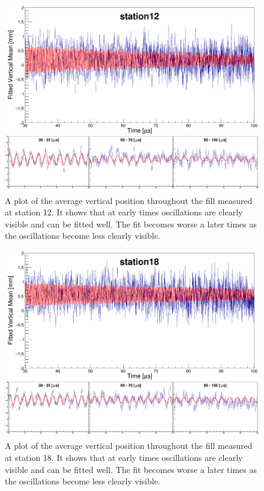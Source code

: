 \begin{figure}[ht]
\centering 
\includegraphics[scale=0.25]{Figures/AverageVerticalPosition_exponentialFit_station12.png}
\decoRule
\caption{A plot of the average vertical position throughout the fill measured at station 12. It shows that at early times oscillations are clearly visible and can be fitted well. The fit becomes worse a later times as the oscillations become less clearly visible.}
\label{fig:AverageVerticalPosition_exponentialFit_station12.png}
\end{figure}

\begin{figure}[ht]
\centering 
\includegraphics[scale=0.25]{Figures/AverageVerticalPosition_exponentialFit_station18.png}
\decoRule
\caption{A plot of the average vertical position throughout the fill measured at station 18. It shows that at early times oscillations are clearly visible and can be fitted well. The fit becomes worse a later times as the oscillations become less clearly visible.}
\label{fig:AverageVerticalPosition_exponentialFit_station18.png}
\end{figure}

